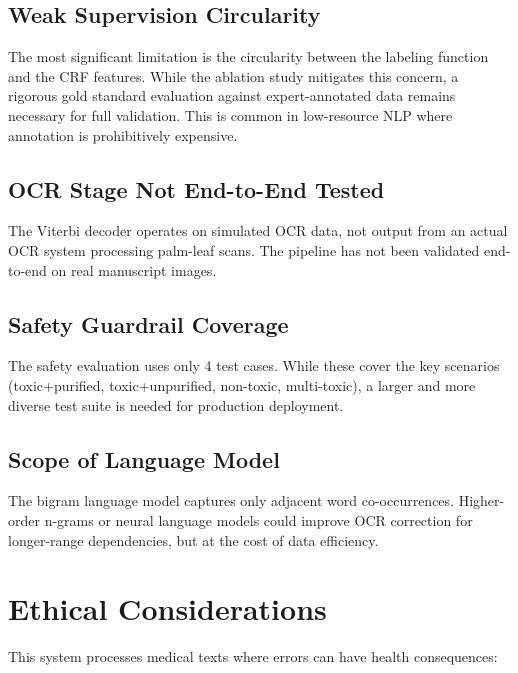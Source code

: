 \documentclass[12pt, a4paper, twoside]{report}
\begin{document}
\subsection{Weak Supervision Circularity}

The most significant limitation is the circularity between the labeling function and the CRF features. While the ablation study mitigates this concern, a rigorous gold standard evaluation against expert-annotated data remains necessary for full validation. This is common in low-resource NLP where annotation is prohibitively expensive.

\subsection{OCR Stage Not End-to-End Tested}

The Viterbi decoder operates on simulated OCR data, not output from an actual OCR system processing palm-leaf scans. The pipeline has not been validated end-to-end on real manuscript images.

\subsection{Safety Guardrail Coverage}

The safety evaluation uses only 4 test cases. While these cover the key scenarios (toxic+purified, toxic+unpurified, non-toxic, multi-toxic), a larger and more diverse test suite is needed for production deployment.

\subsection{Scope of Language Model}

The bigram language model captures only adjacent word co-occurrences. Higher-order n-grams or neural language models could improve OCR correction for longer-range dependencies, but at the cost of data efficiency.

\section{Ethical Considerations}
\label{sec:ethics}

This system processes medical texts where errors can have health consequences:
\end{document}
